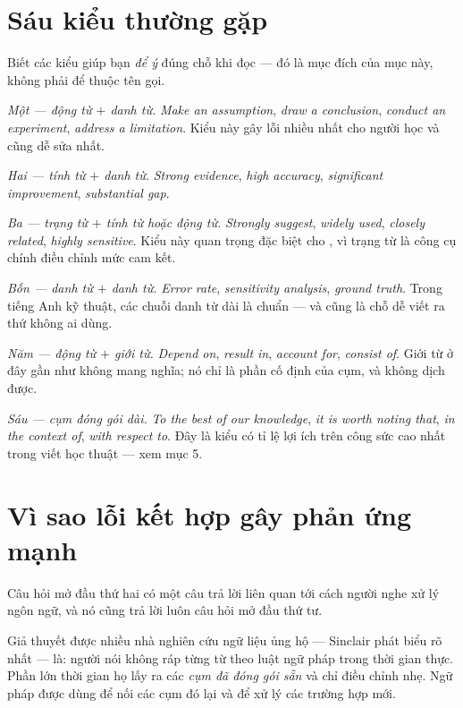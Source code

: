 \documentclass[../../english.tex]{subfiles}
\begin{document}
\section{Sáu kiểu thường gặp}

Biết các kiểu giúp bạn \emph{để ý} đúng chỗ khi đọc --- đó là mục đích của mục này, không phải để thuộc tên gọi.

\emph{Một --- động từ \(+\) danh từ.} \emph{Make an assumption}, \emph{draw a conclusion}, \emph{conduct an experiment}, \emph{address a limitation}. Kiểu này gây lỗi nhiều nhất cho người học và cũng dễ sửa nhất.

\emph{Hai --- tính từ \(+\) danh từ.} \emph{Strong evidence}, \emph{high accuracy}, \emph{significant improvement}, \emph{substantial gap}.

\emph{Ba --- trạng từ \(+\) tính từ hoặc động từ.} \emph{Strongly suggest}, \emph{widely used}, \emph{closely related}, \emph{highly sensitive}. Kiểu này quan trọng đặc biệt cho , vì trạng từ là công cụ chính điều chỉnh mức cam kết.

\emph{Bốn --- danh từ \(+\) danh từ.} \emph{Error rate}, \emph{sensitivity analysis}, \emph{ground truth}. Trong tiếng Anh kỹ thuật, các chuỗi danh từ dài là chuẩn --- và cũng là chỗ dễ viết ra thứ không ai dùng.

\emph{Năm --- động từ \(+\) giới từ.} \emph{Depend on}, \emph{result in}, \emph{account for}, \emph{consist of}. Giới từ ở đây gần như không mang nghĩa; nó chỉ là phần cố định của cụm, và không dịch được.

\emph{Sáu --- cụm đóng gói dài.} \emph{To the best of our knowledge}, \emph{it is worth noting that}, \emph{in the context of}, \emph{with respect to}. Đây là kiểu có tỉ lệ lợi ích trên công sức cao nhất trong viết học thuật --- xem mục 5.

\section{Vì sao lỗi kết hợp gây phản ứng mạnh}

Câu hỏi mở đầu thứ hai có một câu trả lời liên quan tới cách người nghe xử lý ngôn ngữ, và nó cũng trả lời luôn câu hỏi mở đầu thứ tư.

Giả thuyết được nhiều nhà nghiên cứu ngữ liệu ủng hộ --- Sinclair phát biểu rõ nhất\cite{sinclair1991} --- là: người nói không ráp từng từ theo luật ngữ pháp trong thời gian thực. Phần lớn thời gian họ lấy ra các \emph{cụm đã đóng gói sẵn} và chỉ điều chỉnh nhẹ. Ngữ pháp được dùng để nối các cụm đó lại và để xử lý các trường hợp mới.
\end{document}
